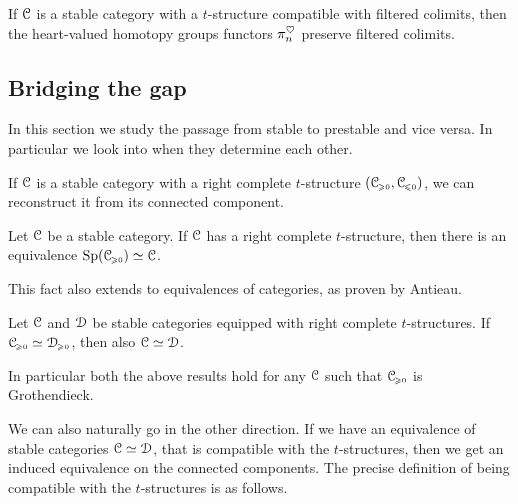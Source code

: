 \begin{remark}
    If $\EuScript{C}$ is a stable category with a $t$-structure compatible with filtered colimits, then the heart-valued homotopy groups functors $\pi_n^\heartsuit$ preserve filtered colimits. 
\end{remark}













\subsection{Bridging the gap}

In this section we study the passage from stable to prestable and vice versa. In particular we look into when they determine each other. 

If $\EuScript{C}$ is a stable category with a right complete $t$-structure $(\EuScript{C}_{\hspace{-1pt}\scriptscriptstyle\geqslant 0}, \EuScript{C}_{\hspace{-1pt}\scriptscriptstyle\leqslant 0})$, we can reconstruct it from its connected component. 

\begin{lemma}
    \label{ch4:lm:right-complete-then-equiv-to-sp}
    Let $\EuScript{C}$ be a stable category. If $\EuScript{C}$ has a right complete $t$-structure, then there is an equivalence $\mathrm{Sp}(\EuScript{C}_{\hspace{-1pt}\scriptscriptstyle\geqslant 0})\simeq \EuScript{C}$. 
\end{lemma}

This fact also extends to equivalences of categories, as proven by Antieau. 

\begin{lemma}
    \label{ch4:lm:if-prestable-equiv-then-stable-equiv}
    Let $\EuScript{C}$ and $\EuScript{D}$ be stable categories equipped with right complete $t$-structures. If $\EuScript{C}_{\hspace{-1pt}\scriptscriptstyle\geqslant 0}\simeq \EuScript{D}_{\hspace{-1pt}\scriptscriptstyle\geqslant 0}$, then also $\EuScript{C}\simeq \EuScript{D}$. 
\end{lemma}

\begin{remark}
    In particular both the above results hold for any $\EuScript{C}$ such that $\EuScript{C}_{\hspace{-1pt}\scriptscriptstyle\geqslant 0}$ is Grothendieck. 
\end{remark}

We can also naturally go in the other direction. If we have an equivalence of stable categories $\EuScript{C}\simeq \EuScript{D}$, that is compatible with the $t$-structures, then we get an induced equivalence on the connected components. The precise definition of being compatible with the $t$-structures is as follows. 


